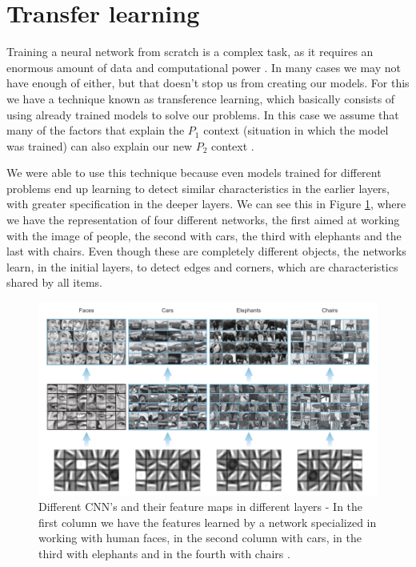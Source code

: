 \section{Transfer learning} \label{transferlearning}
Training a neural network from scratch is a complex task, as it requires an enormous amount of data and computational power \cite{elgendy2020}. In many cases we may not have enough of either, but that doesn't stop us from creating our models. For this we have a technique known as transference learning, which basically consists of using already trained models to solve our problems. In this case we assume that many of the factors that explain the $P_1$ context (situation in which the model was trained) can also explain our new $P_2$ context \cite{goodfellow2016}.

We were able to use this technique because even models trained for different problems end up learning to detect similar characteristics in the earlier layers, with greater specification in the deeper layers. We can see this in Figure \ref{fig:figure139}, where we have the representation of four different networks, the first aimed at working with the image of people, the second with cars, the third with elephants and the last with chairs. Even though these are completely different objects, the networks learn, in the initial layers, to detect edges and corners, which are characteristics shared by all items.

\begin{figure}
    \centering
    \includegraphics[scale=0.4]{Part 3 - Learning Systems/Supervised Learning/Deep Learning/images/figure139.png}
    \caption{Different CNN's and their feature maps in different layers - In the first column we have the features learned by a network specialized in working with human faces, in the second column with cars, in the third with elephants and in the fourth with chairs \cite{elgendy2020}.}
    \label{fig:figure139}
\end{figure}

